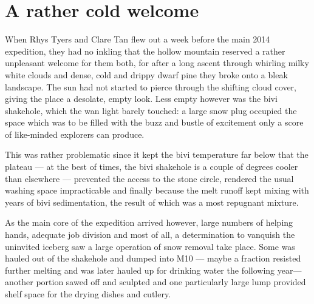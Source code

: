 
\begin{marginfigure}
\end{marginfigure}

\section{A rather cold welcome}

When Rhys Tyers and Clare Tan flew out a week before the main 2014 expedition, they had no inkling that the hollow mountain reserved a rather unpleasant welcome for them both, for after a long ascent through whirling milky white clouds and dense, cold and drippy dwarf pine they broke onto a bleak landscape. The sun had not started to pierce through the shifting cloud cover, giving the place a desolate, empty look. Less empty however was the bivi shakehole, which the wan light barely touched: a large snow plug occupied the space which was to be filled with the buzz and bustle of excitement only a score of like-minded explorers can produce.

This was rather problematic since it kept the bivi temperature far below that the plateau --- at the best of times, the bivi shakehole is a couple of degrees cooler than elsewhere --- prevented the access to the stone circle, rendered the usual washing space impracticable and finally because the melt runoff kept mixing with years of bivi sedimentation, the result of which was a most repugnant mixture. 

As the main core of the expedition arrived however, large numbers of helping hands, adequate job division and most of all, a determination to vanquish the uninvited iceberg saw a large operation of snow removal take place. Some was hauled out of the shakehole and dumped into M10 --- maybe a fraction resisted further melting and was later hauled up for drinking water the following year--- another portion sawed off and sculpted and one particularly large lump provided shelf space for the drying dishes and cutlery.

